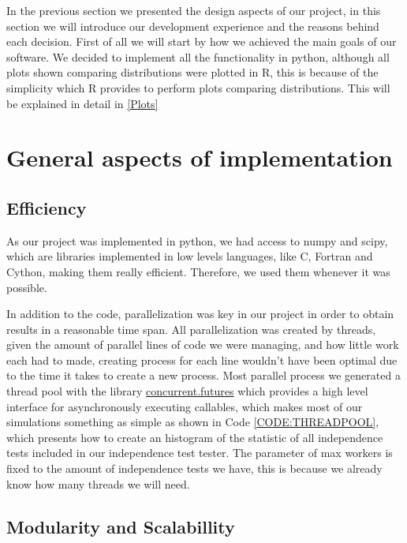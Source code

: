 In the previous section we presented the design aspects of our project, in this section we will introduce our development experience and the reasons behind each decision.
First of all we will start by how we achieved the main goals of our software.
We decided to implement all the functionality in python, although all plots shown comparing distributions were plotted in R, this is because of the simplicity which R provides to perform plots comparing distributions. This will be explained in detail in \ref{Plots}

\section{General aspects of implementation}

\subsection{Efficiency}

As our project was implemented in python, we had access to numpy and scipy, which are libraries implemented in low levels languages, like C, Fortran and Cython, making them really efficient. Therefore, we used them whenever it was possible.

In addition to the code, parallelization was key in our project in order to obtain results in a reasonable time span. All parallelization was created by threads, given the amount of parallel lines of code we were managing, and how little work each had to made, creating process for each line wouldn't have been optimal due to the time it takes to create a new process. 
Most parallel process we generated a thread pool with the library \href{https://pythonhosted.org/futures/}{concurrent.futures} which provides a high level interface for asynchronously executing callables, which makes most of our simulations something as simple as shown in Code \ref{CODE:THREADPOOL}, which presents how to create an histogram of the statistic of all independence tests included in our independence test tester. The parameter of max workers is fixed to the amount of independence tests we have, this is because we already know how many threads we will need.
\label{CODE:THREADPOOL}

\subsection{Modularity and Scalabillity}

